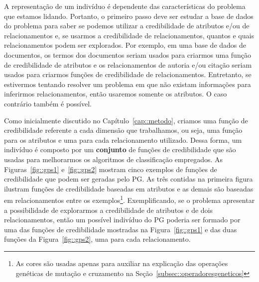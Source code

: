 A representação de um indivíduo é dependente das características do problema que estamos lidando. 
Portanto, o primeiro passo deve ser estudar a base de dados do problema para saber se podemos utilizar a credibilidade de atributos e/ou de relacionamentos e, se usarmos a credibilidade de relacionamentos, quantos e quais relacionamentos podem ser explorados.
Por exemplo, em uma base de dados de documentos, os termos dos documentos seriam usados para criarmos uma função de credibilidade de atributos e os relacionamentos de autoria e/ou citação seriam usados para criarmos funções de credibilidade de relacionamentos. Entretanto, se estivermos tentando resolver um problema em que não existam informações para inferirmos relacionamentos, então usaremos somente os atributos. O caso contrário também é possível.

Como inicialmente discutido no Capítulo~\ref{cap::metodo}, criamos uma função de credibilidade referente a cada dimensão que trabalhamos, ou seja, uma função para os atributos e uma para cada relacionamento utilizado. Dessa forma, um indivíduo é composto por um \textbf{conjunto} de funções de credibilidade que são usadas para melhorarmos os algoritmos de classificação empregados.
As Figuras~\ref{fig::gps1} e~\ref{fig::gps2} mostram cinco exemplos de funções de credibilidade que podem ser geradas pelo \textsc{PG}. As três contidas na primeira figura ilustram funções de credibilidade baseadas em atributos e as demais são baseadas em relacionamentos entre os exemplos\footnote{As cores são usadas apenas para auxiliar na explicação das operações genéticas de mutação e cruzamento na Seção~\ref{subsec::operadoresgeneticos}}.
Exemplificando, se o problema apresentar a possibilidade de explorarmos a credibilidade de atributos e de dois relacionamentos, então um possível indivíduo do \textsc{PG} poderia ser formado por uma das funções de credibilidade mostradas na Figura~\ref{fig::gps1} e das duas funções da Figura~\ref{fig::gps2}, uma para cada relacionamento.


